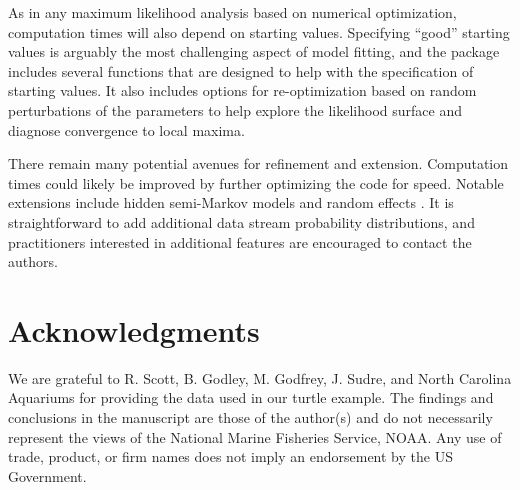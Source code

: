 \documentclass[12pt]{article}\usepackage[]{graphicx}\usepackage[]{color}
\begin{document}
As in any maximum likelihood analysis based on numerical optimization, computation times will also depend on starting values. Specifying ``good'' starting values is arguably the most challenging aspect of model fitting, and the package includes several functions that are designed to help with the specification of starting values. It also includes options for re-optimization based on random perturbations of the parameters to help explore the likelihood surface and diagnose convergence to local maxima. %


There remain many potential avenues for refinement and extension. Computation times could likely be improved by further optimizing the code for speed. Notable extensions include hidden semi-Markov models and random effects %
\citep{ZucchiniEtAl2016}. %
It is straightforward to add additional data stream probability distributions, and practitioners interested in additional features are encouraged to contact the authors.

\section*{Acknowledgments}
\noindent We are grateful to R. Scott, B. Godley, M. Godfrey, J. Sudre, and North Carolina Aquariums for providing the data used in our turtle example. The findings and conclusions in the manuscript are those of the author(s) and do not necessarily represent the views of the National Marine Fisheries Service, NOAA. Any use of trade, product, or firm names does not imply an endorsement by the US Government.
\end{document}

